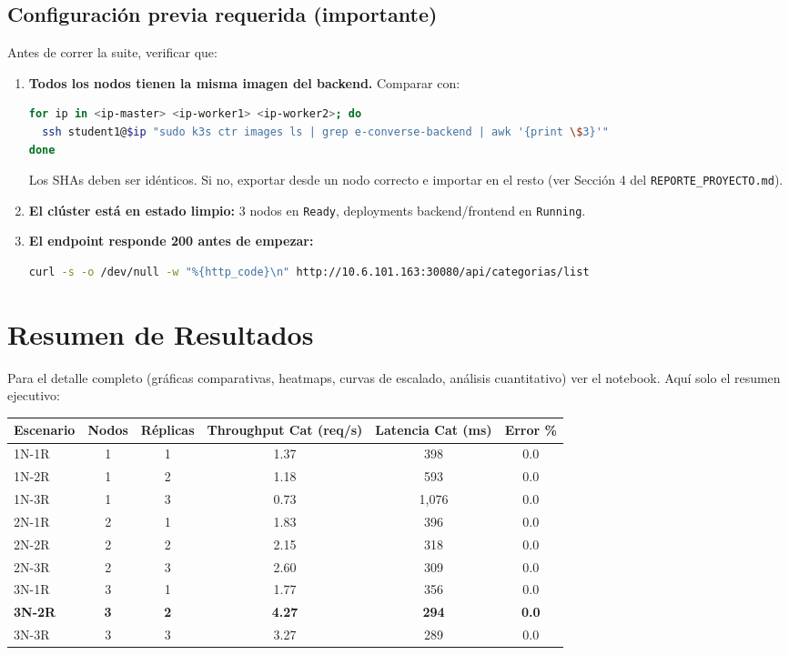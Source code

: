\documentclass[11pt,a4paper]{article}
\begin{document}
\subsection{Configuración previa requerida (importante)}

Antes de correr la suite, verificar que:

\begin{enumerate}
    \item \textbf{Todos los nodos tienen la misma imagen del backend.} Comparar con:
    \begin{lstlisting}[language=bash]
for ip in <ip-master> <ip-worker1> <ip-worker2>; do
  ssh student1@$ip "sudo k3s ctr images ls | grep e-converse-backend | awk '{print \$3}'"
done
    \end{lstlisting}
    Los SHAs deben ser idénticos. Si no, exportar desde un nodo correcto e importar en el resto (ver Sección 4 del \texttt{REPORTE\_PROYECTO.md}).

    \item \textbf{El clúster está en estado limpio:} 3 nodos en \texttt{Ready}, deployments backend/frontend en \texttt{Running}.

    \item \textbf{El endpoint responde 200 antes de empezar:}
    \begin{lstlisting}[language=bash]
curl -s -o /dev/null -w "%{http_code}\n" http://10.6.101.163:30080/api/categorias/list
    \end{lstlisting}
\end{enumerate}

\section{Resumen de Resultados}

Para el detalle completo (gráficas comparativas, heatmaps, curvas de escalado, análisis cuantitativo) ver el notebook. Aquí solo el resumen ejecutivo:

\begin{center}
\small
\begin{tabular}{lccccc}
\toprule
\textbf{Escenario} & \textbf{Nodos} & \textbf{Réplicas} & \textbf{Throughput Cat (req/s)} & \textbf{Latencia Cat (ms)} & \textbf{Error \%} \\
\midrule
1N-1R & 1 & 1 & 1.37 & 398 & 0.0 \\
1N-2R & 1 & 2 & 1.18 & 593 & 0.0 \\
1N-3R & 1 & 3 & 0.73 & 1{,}076 & 0.0 \\
2N-1R & 2 & 1 & 1.83 & 396 & 0.0 \\
2N-2R & 2 & 2 & 2.15 & 318 & 0.0 \\
2N-3R & 2 & 3 & 2.60 & 309 & 0.0 \\
3N-1R & 3 & 1 & 1.77 & 356 & 0.0 \\
\textbf{3N-2R} & \textbf{3} & \textbf{2} & \textbf{4.27} & \textbf{294} & \textbf{0.0} \\
3N-3R & 3 & 3 & 3.27 & 289 & 0.0 \\
\bottomrule
\end{tabular}
\end{center}
\end{document}
